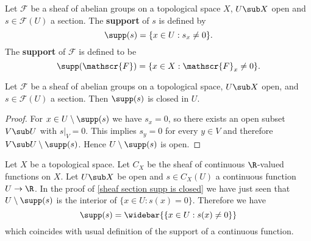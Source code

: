 \begin{definition}
Let $\mathscr{F}$ be a sheaf of abelian groups on a topological space $X$, $U\sub X$ open and $s\in\mathscr{F}(U)$ a section. The \textbf{support} of $s$ is defined by
\[\supp(s)=\{x\in U:s_x\neq 0\}.\]
The \textbf{support} of $\mathscr{F}$ is defined to be
\[\supp(\mathscr{F})=\{x\in X:\mathscr{F}_x\neq 0\}.\]
\end{definition}
\begin{proposition}\label{sheaf section supp is closed}
Let $\mathscr{F}$ be a sheaf of abelian groups on a topological space, $U\sub X$ open, and $s\in\mathscr{F}(U)$ a section. Then $\supp(s)$ is closed in $U$.
\end{proposition}
\begin{proof}
For $x\in U\setminus\supp(s)$ we have $s_x=0$, so there exists an open subset $V\sub U$ with $s|_V=0$. This implies $s_{y}=0$ for every $y\in V$ and therefore $V\sub U\setminus\supp(s)$. Hence $U\setminus\supp(s)$ is open.
\end{proof}
\begin{example}
Let $X$ be a topological space. Let $C_X$ be the sheaf of continuous $\R$-valued functions on $X$. Let $U\sub X$ be open and $s\in C_X(U)$ a continuous function $U\to\R$. In the proof of \cref{sheaf section supp is closed} we have just seen that $U\setminus\supp(s)$ is the interior of $\{x\in U:s(x)=0\}$. Therefore we have
\[\supp(s)=\widebar{\{x\in U:s(x)\neq 0\}}\]
which coincides with usual definition of the support of a continuous function.
\end{example}
